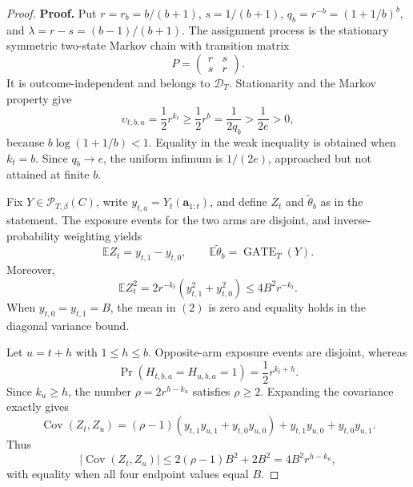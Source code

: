 \documentclass{article}
\begin{document}
\begin{proof}
\textbf{Proof.} Put \(r=r_b=b/(b+1)\), \(s=1/(b+1)\), \(q_b=r^{-b}=(1+1/b)^b\), and \(\lambda=r-s=(b-1)/(b+1)\). The assignment process is the stationary symmetric two-state Markov chain with transition matrix
\[
P=\begin{pmatrix}r&s\\s&r\end{pmatrix}.
\]
It is outcome-independent and belongs to \(\mathcal D_T\). Stationarity and the Markov property give
\[
\upsilon_{t,b,a}=\frac12r^{k_t}\ge\frac12r^b=\frac{1}{2q_b}>\frac{1}{2e}>0,
\tag{1}
\]
because \(b\log(1+1/b)<1\). Equality in the weak inequality is obtained when \(k_t=b\). Since \(q_b\to e\), the uniform infimum is \(1/(2e)\), approached but not attained at finite \(b\).

Fix \(Y\in\mathcal P_{T,\beta}(C)\), write \(y_{t,a}=Y_t(\mathbf a_{1:t})\), and define \(Z_t\) and \(\widetilde\theta_b\) as in the statement. The exposure events for the two arms are disjoint, and inverse-probability weighting yields
\[
\mathbb EZ_t=y_{t,1}-y_{t,0},\qquad \mathbb E\widetilde\theta_b=\operatorname{GATE}_T(Y).
\tag{2}
\]
Moreover,
\[
\mathbb EZ_t^2=2r^{-k_t}(y_{t,1}^2+y_{t,0}^2)\le4B^2r^{-k_t}.
\tag{3}
\]
When \(y_{t,0}=y_{t,1}=B\), the mean in \((2)\) is zero and equality holds in the diagonal variance bound.

Let \(u=t+h\) with \(1\le h\le b\). Opposite-arm exposure events are disjoint, whereas
\[
\Pr(H_{t,b,a}=H_{u,b,a}=1)=\frac12r^{k_t+h}.
\]
Since \(k_u\ge h\), the number \(\rho=2r^{h-k_u}\) satisfies \(\rho\ge2\). Expanding the covariance exactly gives
\[
\operatorname{Cov}(Z_t,Z_u)=(\rho-1)(y_{t,1}y_{u,1}+y_{t,0}y_{u,0})+y_{t,1}y_{u,0}+y_{t,0}y_{u,1}.
\tag{4}
\]
Thus
\[
|\operatorname{Cov}(Z_t,Z_u)|\le2(\rho-1)B^2+2B^2=4B^2r^{h-k_u},
\tag{5}
\]
with equality when all four endpoint values equal \(B\).


\end{proof}
\end{document}
